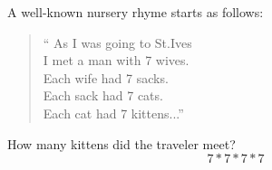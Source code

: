 \item A well-known nursery rhyme starts as follows:
\begin{verse}
    \enquote{
    As I was going to St.\@ Ives\\
    I met a man with 7 wives.\\
    Each wife had 7 sacks.\\
    Each sack had 7 cats.\\
    Each cat had 7 kittens...}
\end{verse}
How many kittens did the traveler meet?
\[ 7 * 7 * 7 * 7 \]